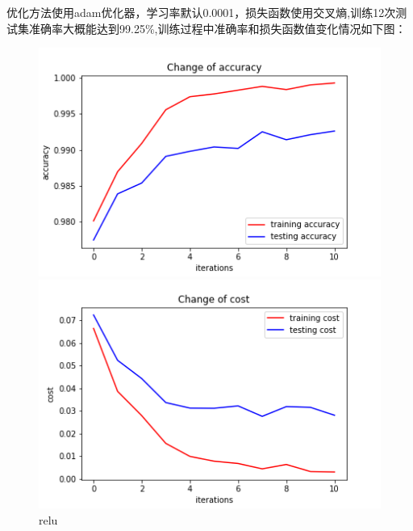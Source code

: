 \documentclass{article}
\begin{document}
优化方法使用adam优化器，学习率默认0.0001，损失函数使用交叉熵,训练12次测试集准确率大概能达到99.25\%,训练过程中准确率和损失函数值变化情况如下图：
\begin{figure}[htb]
    \centering 
    \begin{minipage}[t]{0.5\linewidth}
    \centering 
    \includegraphics[scale=0.3]{accuracy_mnist.png} 
    \end{minipage}%
    \begin{minipage}[t]{0.5\linewidth} 
    \centering 
    \includegraphics[scale=0.3]{cost_mnist.png} 
    \end{minipage}%
    \centering 
    \caption{relu} 
\end{figure}
\newpage
\end{document}
